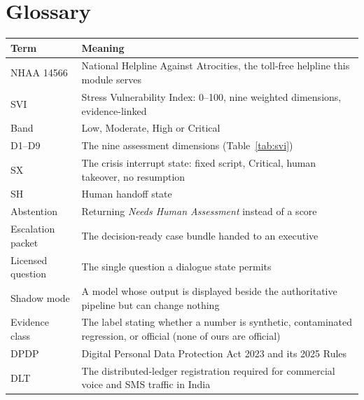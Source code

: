 \documentclass[11pt,a4paper]{article}
\begin{document}
\section{Glossary}
\begin{tabularx}{\linewidth}{@{}>{\raggedright\arraybackslash}p{3.2cm}X@{}}
\toprule
Term & Meaning \\
\midrule
NHAA 14566 & National Helpline Against Atrocities, the toll-free helpline this module serves \\
SVI & Stress Vulnerability Index: 0--100, nine weighted dimensions, evidence-linked \\
Band & Low, Moderate, High or Critical \\
D1--D9 & The nine assessment dimensions (Table~\ref{tab:svi}) \\
SX & The crisis interrupt state: fixed script, Critical, human takeover, no resumption \\
SH & Human handoff state \\
Abstention & Returning \emph{Needs Human Assessment} instead of a score \\
Escalation packet & The decision-ready case bundle handed to an executive \\
Licensed question & The single question a dialogue state permits \\
Shadow mode & A model whose output is displayed beside the authoritative pipeline but can change
nothing \\
Evidence class & The label stating whether a number is synthetic, contaminated regression, or
official (none of ours are official) \\
DPDP & Digital Personal Data Protection Act 2023 and its 2025 Rules \\
DLT & The distributed-ledger registration required for commercial voice and SMS traffic in India \\
\bottomrule
\end{tabularx}
\end{document}
